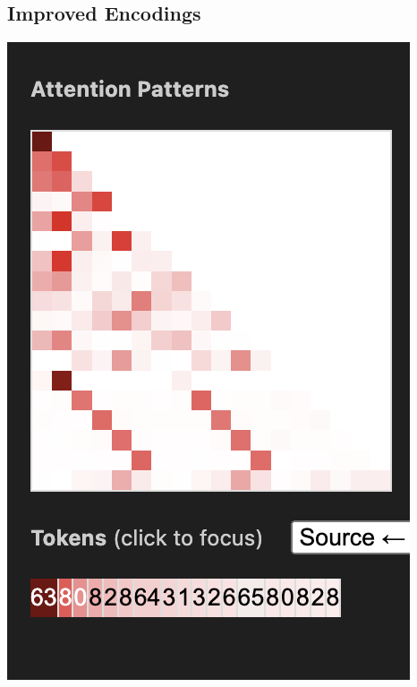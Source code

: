 \documentclass{article}
\begin{document}
\subsection{Improved Encodings}
\begin{center}
    \includegraphics[scale=0.4]{images/att_encoding_1hd1.png}

\end{center}
\end{document}
